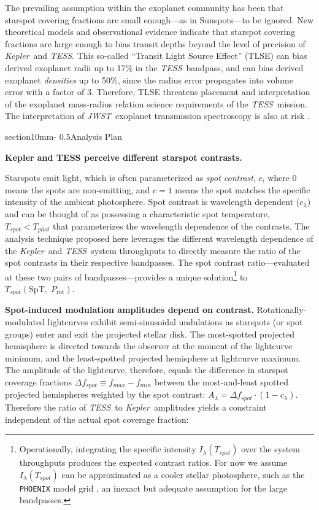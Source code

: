 \documentclass[letterpaper,11pt]{article}
\makeatletter
\renewcommand{\section}{\@startsection%
{section}{1}{0mm}{-\baselineskip}%
{0.5\baselineskip}{\normalfont\Large\bfseries}}%
\newcommand{\tess}{{\it TESS}}
\newcommand{\jwst}{{\it JWST}}
\newcommand{\kepler}{{\it Kepler}}
\makeatother
\begin{document}
The prevailing assumption within the exoplanet community has been that starspot covering fractions are small enough---as in Sunspots---to be ignored.  New theoretical models \citep{2018ApJ...853..122R} and observational evidence \citep{2016MNRAS.463.2494F} indicate that starspot covering fractions are large enough to bias transit depths beyond the level of precision of \kepler\ and \tess.  This so-called ``Transit Light Source Effect'' (TLSE) can bias derived exoplanet radii up to 17\% in the \tess\ bandpass, and can bias derived exoplanet \emph{densities} up to 50\%, since the radius error propagates into volume error with a factor of 3.  Therefore, TLSE threatens placement and interpretation of the exoplanet mass-radius relation science requirements of the \tess\ mission.  The interpretation of \jwst\ exoplanet transmission spectroscopy is also at risk \citep{2019AJ....157...11W}.

\section{Analysis Plan}

\textbf{Kepler and TESS perceive different starspot contrasts.}

Starspots emit light, which is often parameterized as \emph{spot contrast}, $c$, where 0 means the spots are non-emitting, and $c=1$ means the spot matches the specific intensity of the ambient photosphere.  Spot contrast is wavelength dependent ($c_\lambda$) and can be thought of as possessing a characteristic spot temperature, $T_{spot}<T_{phot}$ that parameterizes the wavelength dependence of the contrasts.  The analysis technique proposed here leverages the different wavelength dependence of the \kepler\ and \tess\ system throughputs to directly measure the ratio of the spot contrasts in their respective bandpasses.  The spot contrast ratio---evaluated at these two pairs of bandpasses---provides a unique solution\footnote{Operationally, integrating the specific intensity $I_\lambda(T_{spot})$ over the system throughputs produces the expected contrast ratios.  For now we assume $I_\lambda(T_{spot})$ can be approximated as a cooler stellar photosphere, such as the \texttt{PHOENIX} model grid \citep{2013A&A...553A...6H}, an inexact but adequate assumption for the large bandpasses.} to $T_{spot}(\mathrm{SpT},\;P_{\mathrm{rot}})$.

\textbf{Spot-induced modulation amplitudes depend on contrast.}
Rotationally-modulated lightcurves exhibit semi-sinusoidal undulations as starspots (or spot groups) enter and exit the projected stellar disk.  The most-spotted projected hemisphere is directed towards the observer at the moment of the lightcurve minimum, and the least-spotted projected hemisphere at lightcurve maximum.  The amplitude of the lightcurve, therefore, equals the difference in starspot coverage fractions $\Delta f_{spot} \equiv f_{max}-f_{min}$ between the most-and-least spotted projected hemispheres weighted by the spot contrast: $ A_\lambda = \Delta f_{spot} \cdot (1-c_\lambda)$.  Therefore the ratio of \tess\ to \kepler\ amplitudes yields a constraint independent of the actual spot coverage fraction:
\end{document}
